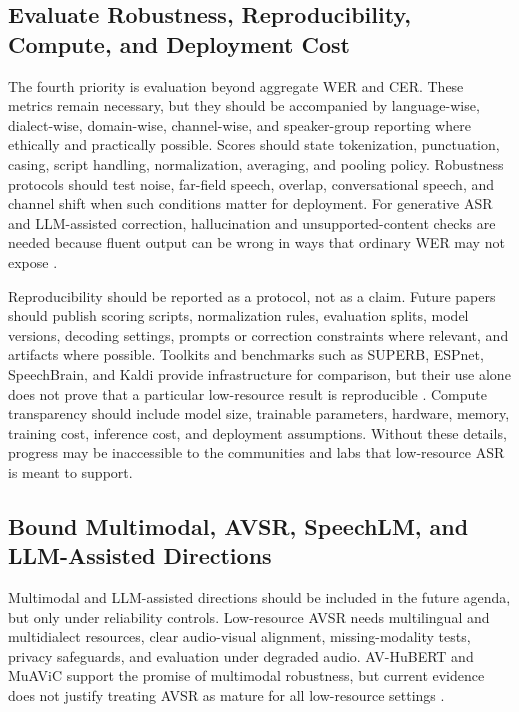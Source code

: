 \documentclass[pdflatex,sn-basic]{sn-jnl}
\theoremstyle{thmstyleone}
\theoremstyle{thmstyletwo}
\theoremstyle{thmstylethree}
\begin{document}
\subsection{Evaluate Robustness, Reproducibility, Compute, and Deployment Cost}

The fourth priority is evaluation beyond aggregate WER and CER. These metrics remain necessary, but they should be accompanied by language-wise, dialect-wise, domain-wise, channel-wise, and speaker-group reporting where ethically and practically possible. Scores should state tokenization, punctuation, casing, script handling, normalization, averaging, and pooling policy. Robustness protocols should test noise, far-field speech, overlap, conversational speech, and channel shift when such conditions matter for deployment. For generative ASR and LLM-assisted correction, hallucination and unsupported-content checks are needed because fluent output can be wrong in ways that ordinary WER may not expose \citep{koenecke2024carelesswhisper}.

Reproducibility should be reported as a protocol, not as a claim. Future papers should publish scoring scripts, normalization rules, evaluation splits, model versions, decoding settings, prompts or correction constraints where relevant, and artifacts where possible. Toolkits and benchmarks such as SUPERB, ESPnet, SpeechBrain, and Kaldi provide infrastructure for comparison, but their use alone does not prove that a particular low-resource result is reproducible \citep{yang2021superb,watanabe2018espnet,ravanelli2021speechbrain,povey2011kaldi}. Compute transparency should include model size, trainable parameters, hardware, memory, training cost, inference cost, and deployment assumptions. Without these details, progress may be inaccessible to the communities and labs that low-resource ASR is meant to support.

\subsection{Bound Multimodal, AVSR, SpeechLM, and LLM-Assisted Directions}

Multimodal and LLM-assisted directions should be included in the future agenda, but only under reliability controls. Low-resource AVSR needs multilingual and multidialect resources, clear audio-visual alignment, missing-modality tests, privacy safeguards, and evaluation under degraded audio. AV-HuBERT and MuAViC support the promise of multimodal robustness, but current evidence does not justify treating AVSR as mature for all low-resource settings \citep{shi2022avhubert,anwar23_interspeech}.
\end{document}
